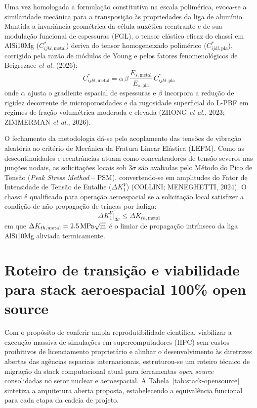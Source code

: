 Uma vez homologada a formulação constitutiva na escala polimérica, evoca-se a similaridade mecânica para a transposição às propriedades da liga de alumínio. Mantida a invariância geométrica da célula auxética reentrante e de sua modulação funcional de espessuras (FGL), o tensor elástico eficaz do chassi em AlSi10Mg ($C_{ijkl,\text{metal}}^{*}$) deriva do tensor homogeneizado polimérico ($C_{ijkl,\text{pla}}^{*}$), corrigido pela razão de módulos de Young e pelos fatores fenomenológicos de Beigrezaee \textit{et al.} (2026):
\begin{equation}
  C_{ijkl,\text{metal}}^{*} = \alpha\,\beta\,\frac{E_{s,\text{metal}}}{E_{s,\text{pla}}}\, C_{ijkl,\text{pla}}^{*}
  \label{eq:transposicao}
\end{equation}
onde $\alpha$ ajusta o gradiente espacial de espessuras e $\beta$ incorpora a redução de rigidez decorrente de microporosidades e da rugosidade superficial do L-PBF em regimes de fração volumétrica moderada e elevada (ZHONG \textit{et al.}, 2023; ZIMMERMAN \textit{et al.}, 2026).

O fechamento da metodologia dá-se pelo acoplamento das tensões de vibração aleatória ao critério de Mecânica da Fratura Linear Elástica (LEFM). Como as descontinuidades e reentrâncias atuam como concentradores de tensão severos nas junções nodais, as solicitações locais sob $3\sigma$ são avaliadas pelo Método do Pico de Tensão (\textit{Peak Stress Method} -- PSM), convertendo-se em amplitudes do Fator de Intensidade de Tensão de Entalhe ($\Delta K_1^{V}$) (COLLINI; MENEGHETTI, 2024). O chassi é qualificado para operação aeroespacial se a solicitação local satisfizer a condição de não propagação de trincas por fadiga:
\begin{equation}
  \Delta K_1^{V}\big|_{3\sigma} \le \Delta K_{th,\text{metal}}
  \label{eq:lefm}
\end{equation}
em que $\Delta K_{th,\text{metal}} = \SI{2.5}{\mega\pascal\sqrt{\metre}}$ é o limiar de propagação intrínseco da liga AlSi10Mg aliviada termicamente.

\section{Roteiro de transição e viabilidade para stack aeroespacial 100\% open source}
\label{sec:opensource}

Com o propósito de conferir ampla reprodutibilidade científica, viabilizar a execução massiva de simulações em supercomputadores (HPC) sem custos proibitivos de licenciamento proprietário e alinhar o desenvolvimento às diretrizes abertas das agências espaciais internacionais, estruturou-se um roteiro técnico de migração da stack computacional atual para ferramentas \textit{open source} consolidadas no setor nuclear e aeroespacial. A Tabela~\ref{tab:stack-opensource} sintetiza a arquitetura aberta proposta, estabelecendo a equivalência funcional para cada etapa da cadeia de projeto.

